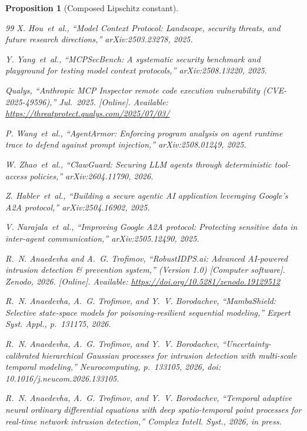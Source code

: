 \documentclass{ieeeaccess}
\newtheorem{proposition}[theorem]{Proposition}
\begin{document}
\begin{proposition}[Composed Lipschitz constant]
\begin{thebibliography}{99}
 X. Hou~\textit{et~al.}, ``Model Context Protocol: Landscape, security threats, and future research directions,'' arXiv:2503.23278, 2025.

 Y. Yang~\textit{et~al.}, ``MCPSecBench: A systematic security benchmark and playground for testing model context protocols,'' arXiv:2508.13220, 2025.

 Qualys, ``Anthropic MCP Inspector remote code execution vulnerability (CVE-2025-49596),'' Jul.~2025. [Online]. Available: \url{https://threatprotect.qualys.com/2025/07/03/}

 P. Wang~\textit{et~al.}, ``AgentArmor: Enforcing program analysis on agent runtime trace to defend against prompt injection,'' arXiv:2508.01249, 2025.

 W. Zhao~\textit{et~al.}, ``ClawGuard: Securing LLM agents through deterministic tool-access policies,'' arXiv:2604.11790, 2026.

 Z. Habler~\textit{et~al.}, ``Building a secure agentic AI application leveraging Google's A2A protocol,'' arXiv:2504.16902, 2025.

 V. Narajala~\textit{et~al.}, ``Improving Google A2A protocol: Protecting sensitive data in inter-agent communication,'' arXiv:2505.12490, 2025.

 R.~N. Anaedevha and A.~G. Trofimov, ``RobustIDPS.ai: Advanced AI-powered intrusion detection \& prevention system,'' (Version 1.0) \textit{[Computer software]}. Zenodo, 2026. [Online]. Available: \url{https://doi.org/10.5281/zenodo.19129512}

 R.~N. Anaedevha, A.~G. Trofimov, and Y.~V. Borodachev, ``MambaShield: Selective state-space models for poisoning-resilient sequential modeling,'' \textit{Expert Syst. Appl.}, p.~131175, 2026.

 R.~N. Anaedevha, A.~G. Trofimov, and Y.~V. Borodachev, ``Uncertainty-calibrated hierarchical Gaussian processes for intrusion detection with multi-scale temporal modeling,'' \textit{Neurocomputing}, p.~133105, 2026, doi: 10.1016/j.neucom.2026.133105.

 R.~N. Anaedevha, A.~G. Trofimov, and Y.~V. Borodachev, ``Temporal adaptive neural ordinary differential equations with deep spatio-temporal point processes for real-time network intrusion detection,'' \textit{Complex Intell. Syst.}, 2026, in press.


\end{thebibliography}
\end{proposition}
\end{document}
